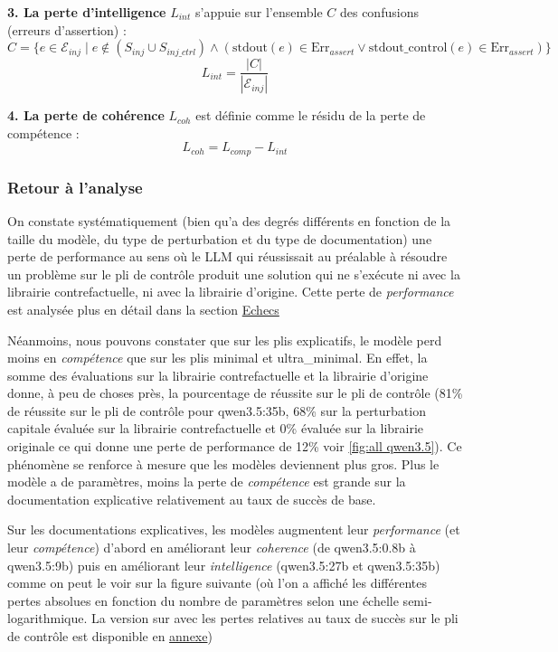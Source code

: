 \documentclass[11pt, a4paper]{article}
\begin{document}
\textbf{3. La perte d'intelligence} $L_{int}$ s'appuie sur l'ensemble $C$ des confusions (erreurs d'assertion) :
\begin{equation}
    C = \{ e \in \mathcal{E}_{inj} \mid e \notin (S_{inj} \cup S_{inj\_ctrl}) \land (\text{stdout}(e) \in \text{Err}_{assert} \lor \text{stdout\_control}(e) \in \text{Err}_{assert}) \}
\end{equation}
\begin{equation}
    L_{int} = \frac{|C|}{|\mathcal{E}_{inj}|}
\end{equation}

\textbf{4. La perte de cohérence} $L_{coh}$ est définie comme le résidu de la perte de compétence :
\begin{equation}
    L_{coh} = L_{comp} - L_{int}
\end{equation}

\subsubsection{Retour à l'analyse}
On constate systématiquement (bien qu'a des degrés différents en fonction de la taille du modèle, du type de perturbation et du type de documentation) une perte de performance au sens où le LLM qui réussissait au préalable à résoudre un problème sur le pli de contrôle produit une solution qui ne s'exécute ni avec la librairie contrefactuelle, ni avec la librairie d'origine. 
Cette perte de \textit{performance} est analysée plus en détail dans la section \hyperref[sec:echec]{Echecs}


Néanmoins, nous pouvons constater que sur les plis explicatifs, le modèle perd moins en \textit{compétence} que sur les plis minimal et ultra\_minimal. En effet, la somme des évaluations sur la librairie contrefactuelle et la librairie d'origine donne, à peu de choses près, la pourcentage de réussite sur le pli de contrôle (81\% de réussite sur le pli de contrôle pour qwen3.5:35b, 68\% sur la perturbation capitale évaluée sur la librairie contrefactuelle et 0\% évaluée sur la librairie originale ce qui donne une perte de performance de 12\% voir \ref{fig:all qwen3.5}).
Ce phénomène se renforce à mesure que les modèles deviennent plus gros. Plus le modèle a de paramètres, moins la perte de \textit{compétence} est grande sur la documentation explicative relativement au taux de succès de base.

Sur les documentations explicatives, les modèles augmentent leur \textit{performance} (et leur \textit{compétence}) d'abord en améliorant leur \textit{coherence} (de qwen3.5:0.8b à qwen3.5:9b) puis en améliorant leur \textit{intelligence} (qwen3.5:27b et qwen3.5:35b) comme on peut le voir sur la figure suivante (où l'on a affiché les différentes pertes absolues en fonction du nombre de paramètres selon une échelle semi-logarithmique. La version sur avec les pertes relatives au taux de succès sur le pli de contrôle est disponible en \hyperref[sec:graphs]{annexe})
\end{document}
